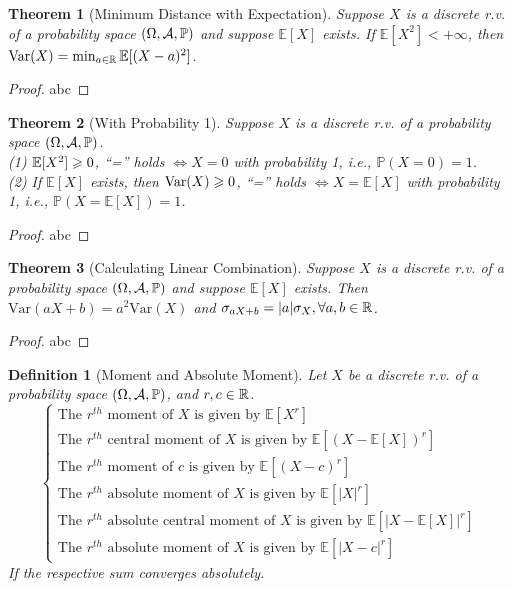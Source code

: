 \documentclass[openany,12pt]{book}
\newtheorem{theorem}{Theorem}[chapter]
\newtheorem{definition}{Definition}[chapter]
\begin{document}
\begin{theorem}[Minimum Distance with Expectation]
  Suppose $X$ is a discrete r.v. of a probability space $(\Omega,\mathcal{A},\mathbb{P})$ and suppose $\mathbb{E}[X]$ exists. If $\mathbb{E}[X^2]<+\infty$, then $\mathrm{Var}(X)=\min_{a\in\mathbb{R}}\mathbb{E}[(X-a)^2]$.
\end{theorem}

\begin{proof}
  abc
\end{proof}

\begin{theorem}[With Probability 1]
  Suppose $X$ is a discrete r.v. of a probability space $(\Omega,\mathcal{A},\mathbb{P})$.\\
  (1) $\mathbb{E}[X^2]\geqslant0$, ``='' holds $\Leftrightarrow X=0$ with probability 1, i.e., $\mathbb{P}(X=0)=1$.\\
  (2) If $\mathbb{E}[X]$ exists, then $\mathrm{Var}(X)\geqslant0$, ``='' holds $\Leftrightarrow X=\mathbb{E}[X]$ with probability 1, i.e., $\mathbb{P}(X=\mathbb{E}[X])=1$.
\end{theorem}

\begin{proof}
  abc
\end{proof}

\begin{theorem}[Calculating Linear Combination]
  Suppose $X$ is a discrete r.v. of a probability space $(\Omega,\mathcal{A},\mathbb{P})$ and suppose $\mathbb{E}[X]$ exists. Then $\mathrm{Var}(aX+b)=a^2 \mathrm{Var}(X)$ and $\sigma_{aX+b}=|a| \sigma_X, \forall a,b\in\mathbb{R}$.
\end{theorem}

\begin{proof}
  abc
\end{proof}

\begin{definition}[Moment and Absolute Moment]
  Let $X$ be a discrete r.v. of a probability space $(\Omega,\mathcal{A},\mathbb{P})$, and $r,c\in\mathbb{R}$.
  $$\left\{
    \begin{array}{l}
      \text{The }r^{th} \text{ moment of } X \text{ is given by } \mathbb{E}[X^r]   \\
      \text{The }r^{th} \text{ central moment of } X \text{ is given by } \mathbb{E}[(X-\mathbb{E}[X])^r]           \\
      \text{The }r^{th} \text{ moment of } c \text{ is given by } \mathbb{E}[(X-c)^r]      \\
      \text{The }r^{th} \text{ absolute moment of } X \text{ is given by } \mathbb{E}[|X|^r]                        \\
      \text{The }r^{th} \text{ absolute central moment of } X \text{ is given by } \mathbb{E}[|X-\mathbb{E}[X] |^r] \\
      \text{The } r^{th} \text{ absolute moment of } X \text{ is given by } \mathbb{E}[|X-c|^r]
    \end{array}
    \right.
  $$
  If the respective sum converges absolutely.
\end{definition}
\end{document}
